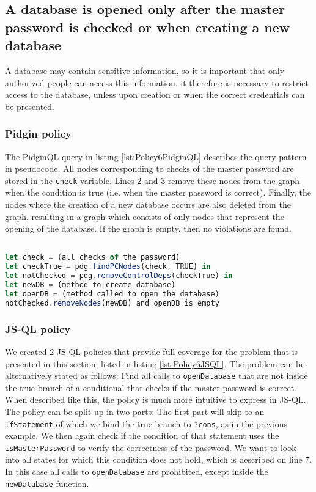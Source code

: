
\subsection{A database is opened only after the master password
is checked or when creating a new database}
\label{subsec:DBOpen}


A database may contain sensitive information, so it is important that only authorized people can access this information. it therefore is necessary to restrict access to the database, unless upon creation or when the correct credentials can be presented. 

\subsubsection*{Pidgin policy}

The PidginQL query in listing \ref{lst:Policy6PidginQL} describes the query pattern in pseudocode. All nodes corresponding to checks of the master password are stored in the \texttt{check} variable. Lines 2 and 3 remove these nodes from the graph when the condition is true (i.e. when the master password is correct). Finally, the nodes where the creation of a new database occurs are also deleted from the graph, resulting in a graph which consists of only nodes that represent the opening of the database. If the graph is empty, then no violations are found.

\begin{lstlisting}[label={lst:Policy6PidginQL},language=JavaScript,caption=Policy 6 in PidginQL,mathescape=true]  % float=t?

let check = (all checks of the password)
let checkTrue = pdg.findPCNodes(check, TRUE) in
let notChecked = pdg.removeControlDeps(checkTrue) in
let newDB = (method to create database)
let openDB = (method called to open the database)
notChecked.removeNodes(newDB) and openDB is empty
\end{lstlisting}

\subsubsection*{JS-QL policy}

We created 2 JS-QL policies that provide full coverage for the problem that is presented in this section, listed in listing \ref{lst:Policy6JSQL}. The problem can be alternatively stated as follows: Find all calls to \texttt{openDatabase} that are not inside the true branch of a conditional that checks if the master password is correct. When described like this, the policy is much more intuitive to express in JS-QL. The policy can be split up in two parts: The first part will skip to an \texttt{IfStatement} of which we bind the true branch to \texttt{?cons}, as in the previous example. We then again check if the condition of that statement uses the \texttt{isMasterPassword} to verify the correctness of the password. We want to look into all states for which this condition does not hold, which is described on line 7. In this case all calls to \texttt{openDatabase} are prohibited, except inside the \texttt{newDatabase} function. 

